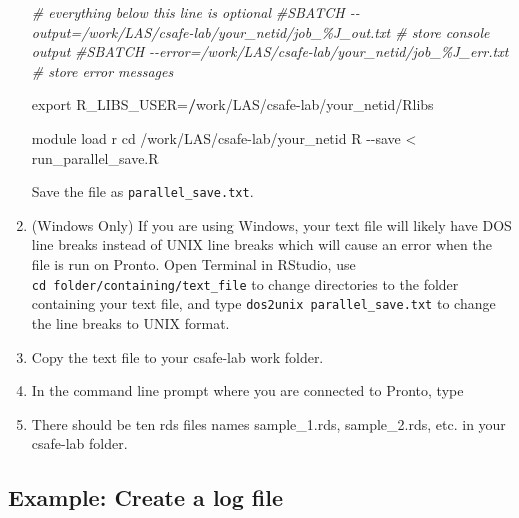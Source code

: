 \documentclass[
]{book}
\newenvironment{Shaded}{\begin{snugshade}}{\end{snugshade}}
\newcommand{\CommentTok}[1]{\textcolor[rgb]{0.56,0.35,0.01}{\textit{#1}}}
\newcommand{\ErrorTok}[1]{\textcolor[rgb]{0.64,0.00,0.00}{\textbf{#1}}}
\newcommand{\ExtensionTok}[1]{#1}
\newcommand{\NormalTok}[1]{#1}
\newcommand{\OtherTok}[1]{\textcolor[rgb]{0.56,0.35,0.01}{#1}}
\newcommand{\SpecialCharTok}[1]{\textcolor[rgb]{0.00,0.00,0.00}{#1}}
\begin{document}
\begin{enumerate}
\begin{Shaded}
\begin{Highlighting}[]
\CommentTok{\# everything below this line is optional}
\CommentTok{\#SBATCH {-}{-}output=/work/LAS/csafe{-}lab/your\_netid/job\_\%J\_out.txt \# store console output}
\CommentTok{\#SBATCH {-}{-}error=/work/LAS/csafe{-}lab/your\_netid/job\_\%J\_err.txt \# store error messages}

\NormalTok{export R\_LIBS\_USER}\OtherTok{=}\ErrorTok{/}\NormalTok{work}\SpecialCharTok{/}\NormalTok{LAS}\SpecialCharTok{/}\NormalTok{csafe}\SpecialCharTok{{-}}\NormalTok{lab}\SpecialCharTok{/}\NormalTok{your\_netid}\SpecialCharTok{/}\NormalTok{Rlibs}

\NormalTok{module load r}
\NormalTok{cd }\SpecialCharTok{/}\NormalTok{work}\SpecialCharTok{/}\NormalTok{LAS}\SpecialCharTok{/}\NormalTok{csafe}\SpecialCharTok{{-}}\NormalTok{lab}\SpecialCharTok{/}\NormalTok{your\_netid}
\NormalTok{R }\SpecialCharTok{{-}{-}}\NormalTok{save }\SpecialCharTok{\textless{}}\NormalTok{ run\_parallel\_save.R}
\end{Highlighting}
\end{Shaded}

  Save the file as \texttt{parallel\_save.txt}.
\item
  (Windows Only) If you are using Windows, your text file will likely have DOS line breaks instead of UNIX line breaks which will cause an error when the file is run on Pronto. Open Terminal in RStudio, use \texttt{cd\ folder/containing/text\_file} to change directories to the folder containing your text file, and type \texttt{dos2unix\ parallel\_save.txt} to change the line breaks to UNIX format.
\item
  Copy the text file to your csafe-lab work folder.
\item
  In the command line prompt where you are connected to Pronto, type

\begin{Shaded}
\end{Shaded}
\item
  There should be ten rds files names sample\_1.rds, sample\_2.rds, etc. in your csafe-lab folder.
\end{enumerate}

\hypertarget{ex-log}{%
\subsection{Example: Create a log file}\label{ex-log}}
\end{document}
